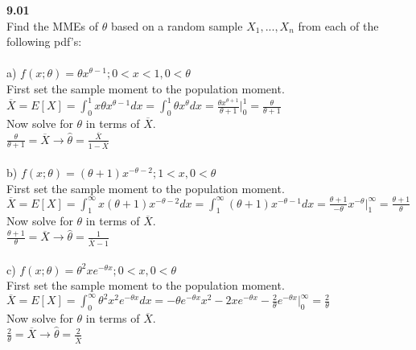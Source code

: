 {\bf 9.01}\\Find the MMEs of $\theta$ based on a random sample $X_1,...,X_n$ from each of the following pdf's:
\\\\a) $f(x;\theta )=\theta x^{\theta -1};0<x<1,0<\theta$
\\First set the sample moment to the population moment.
\\$\overline{X}=E[X]=\int_0^1 x\theta x^{\theta -1} dx=\int_0^1 \theta x^{\theta} dx=\frac{\theta x^{\theta +1}}{\theta +1}\Big|_0^1=\frac{\theta}{\theta +1}$
\\Now solve for $\theta$ in terms of $\overline{X}$.
\\$\frac{\theta}{\theta +1}=\overline{X}\longrightarrow \hat{\theta}=\frac{\overline{X}}{1-\overline{X}}$
\\\\b) $f(x;\theta)=(\theta +1)x^{-\theta -2};1<x,0<\theta$
\\First set the sample moment to the population moment.
\\$\overline{X}=E[X]=\int_1^\infty x(\theta +1)x^{-\theta -2} dx=\int_1^\infty (\theta +1)x^{-\theta -1}dx=\frac{\theta +1}{-\theta}x^{-\theta}\Big|_1^\infty=\frac{\theta +1}{\theta}$
\\Now solve for $\theta$ in terms of $\overline{X}$.
\\$\frac{\theta +1}{\theta}=\overline{X} \longrightarrow \hat{\theta}=\frac{1}{\overline{X}-1}$
\\\\c) $f(x;\theta)=\theta^2xe^{-\theta x};0<x,0<\theta$
\\First set the sample moment to the population moment.
\\$\overline{X}=E[X]=\int_0^\infty \theta^2x^2e^{-\theta x}dx=-\theta e^{-\theta x}x^2-2xe^{-\theta x}-\frac{2}{\theta}e^{-\theta x}\big|_0^\infty =\frac{2}{\theta}$
\\Now solve for $\theta$ in terms of $\overline{X}$.
\\$\frac{2}{\theta}=\overline{X}\longrightarrow \hat{\theta}=\frac{2}{\overline{X}}$